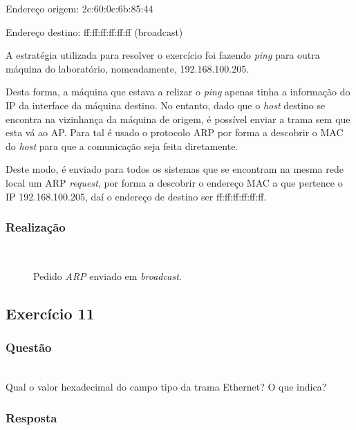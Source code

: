 \documentclass{llncs}
\begin{document}
Endereço origem: 2c:60:0c:6b:85:44

Endereço destino: ff:ff:ff:ff:ff:ff (broadcast)

A estratégia utilizada para resolver o exercício foi fazendo \textit{ping} para outra máquina do laboratório, nomeadamente, 192.168.100.205.

Desta forma, a máquina que estava a relizar o \textit{ping} apenas tinha a informação do IP da interface da máquina destino. No entanto, dado que o \textit{host} destino se encontra na vizinhança da máquina de origem, é possível enviar a trama sem que esta vá ao AP. Para tal é usado o protocolo ARP por forma a descobrir o MAC do \textit{host} para que a comunicação seja feita diretamente.

Deste modo, é enviado para todos os sistemas que se encontram na mesma rede local um ARP \textit{request}, por forma a descobrir o endereço MAC a que pertence o IP 192.168.100.205, daí o endereço de destino ser ff:ff:ff:ff:ff:ff. 

\subsubsection{Realização}\rule[-10pt]{0pt}{10pt}\\

\begin{figure}
	\caption{Pedido \textit{ARP} enviado em \textit{broadcast}.}
	\label{fig:arp_request}
\end{figure} 


\clearpage
\subsection{Exercício 11}
\subsubsection{Questão}\rule[-10pt]{0pt}{10pt}\\

Qual o valor hexadecimal do campo tipo da trama Ethernet? O que indica?

\subsubsection{Resposta}\rule[-10pt]{0pt}{10pt}\\
\end{document}
